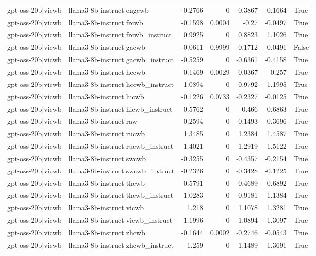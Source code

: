 \begin{table}
\begin{tabular}{l l r r r r l}
gpt-oss-20b|vicwb & llama3-8b-instruct|engcwb & -0.2766 & 0 & -0.3867 & -0.1664 & True \\
gpt-oss-20b|vicwb & llama3-8b-instruct|frcwb & -0.1598 & 0.0004 & -0.27 & -0.0497 & True \\
gpt-oss-20b|vicwb & llama3-8b-instruct|frcwb_instruct & 0.9925 & 0 & 0.8823 & 1.1026 & True \\
gpt-oss-20b|vicwb & llama3-8b-instruct|gacwb & -0.0611 & 0.9999 & -0.1712 & 0.0491 & False \\
gpt-oss-20b|vicwb & llama3-8b-instruct|gacwb_instruct & -0.5259 & 0 & -0.6361 & -0.4158 & True \\
gpt-oss-20b|vicwb & llama3-8b-instruct|hecwb & 0.1469 & 0.0029 & 0.0367 & 0.257 & True \\
gpt-oss-20b|vicwb & llama3-8b-instruct|hecwb_instruct & 1.0894 & 0 & 0.9792 & 1.1995 & True \\
gpt-oss-20b|vicwb & llama3-8b-instruct|hicwb & -0.1226 & 0.0733 & -0.2327 & -0.0125 & True \\
gpt-oss-20b|vicwb & llama3-8b-instruct|hicwb_instruct & 0.5762 & 0 & 0.466 & 0.6863 & True \\
gpt-oss-20b|vicwb & llama3-8b-instruct|raw & 0.2594 & 0 & 0.1493 & 0.3696 & True \\
gpt-oss-20b|vicwb & llama3-8b-instruct|rucwb & 1.3485 & 0 & 1.2384 & 1.4587 & True \\
gpt-oss-20b|vicwb & llama3-8b-instruct|rucwb_instruct & 1.4021 & 0 & 1.2919 & 1.5122 & True \\
gpt-oss-20b|vicwb & llama3-8b-instruct|swcwb & -0.3255 & 0 & -0.4357 & -0.2154 & True \\
gpt-oss-20b|vicwb & llama3-8b-instruct|swcwb_instruct & -0.2326 & 0 & -0.3428 & -0.1225 & True \\
gpt-oss-20b|vicwb & llama3-8b-instruct|thcwb & 0.5791 & 0 & 0.4689 & 0.6892 & True \\
gpt-oss-20b|vicwb & llama3-8b-instruct|thcwb_instruct & 1.0283 & 0 & 0.9181 & 1.1384 & True \\
gpt-oss-20b|vicwb & llama3-8b-instruct|vicwb & 1.218 & 0 & 1.1078 & 1.3281 & True \\
gpt-oss-20b|vicwb & llama3-8b-instruct|vicwb_instruct & 1.1996 & 0 & 1.0894 & 1.3097 & True \\
gpt-oss-20b|vicwb & llama3-8b-instruct|zhcwb & -0.1644 & 0.0002 & -0.2746 & -0.0543 & True \\
gpt-oss-20b|vicwb & llama3-8b-instruct|zhcwb_instruct & 1.259 & 0 & 1.1489 & 1.3691 & True \\

\end{tabular}
\end{table}
